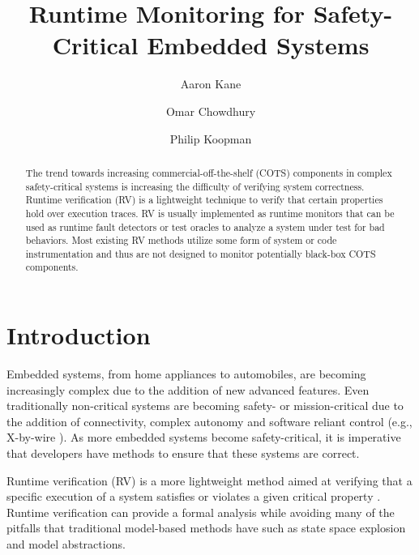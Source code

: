 \documentclass[]{llncs}
\begin{document}
\title{Runtime Monitoring for Safety-Critical Embedded Systems}


\author{Aaron Kane \and Omar Chowdhury \and Philip Koopman}



\maketitle


\begin{abstract}
The trend towards increasing commercial-off-the-shelf (COTS) components in complex safety-critical systems is increasing the difficulty of verifying system correctness. 
Runtime verification (RV) is a lightweight technique to verify that certain properties hold over execution traces.
%
RV is usually implemented as runtime monitors that can be used as runtime fault detectors or test oracles to analyze a system under test for bad behaviors.
%
Most existing RV methods utilize some form of system or code instrumentation and thus are not designed to monitor potentially black-box COTS components.

%
%
\end{abstract}


\section{Introduction}
Embedded systems, from home appliances to automobiles, are becoming increasingly complex due to the addition of new advanced features. 
Even traditionally non-critical systems are becoming safety- or mission-critical due to the addition of connectivity, complex autonomy and software reliant control (e.g., X-by-wire \cite{Leen2002}).
%
As more embedded systems become safety-critical, it is imperative that developers have methods to ensure that these systems are correct. 

Runtime verification (RV) is a more lightweight method aimed at verifying that a specific execution of a system satisfies or violates a given critical property \cite{Leucker2009}. 
%
Runtime verification can provide a formal analysis while avoiding many of the pitfalls that traditional model-based methods have such as state space explosion and model abstractions. 
\end{document}
